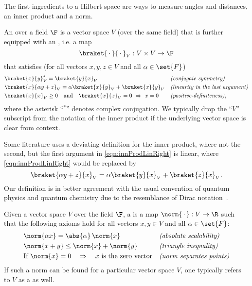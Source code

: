 The first ingredients to a Hilbert space are ways to measure
angles and distances, \ie an inner product and a norm.
\begin{defn}
	\label{def:InnerProduct}
	An  over a field $\F$
	is a vector space $V$ (over the same field)
	that is further equipped with an , i.e. a map
	\[ \braket{\slot}{\slot}_V : V \times V \to \F \]
	that satisfies%
	(for all vectors $x,y,z \in V$ and all $\alpha \in \set{F}$)
	\begin{align}
		\label{eqn:innProdConjSym}
			&\braket{x}{y}_V^\ast = \braket{y}{x}_V &&
			\text{\textit{(conjugate symmetry)}} \\
		\label{eqn:innProdLinRight}
			&\braket{x}{\alpha y + z}_V = \alpha \braket{x}{y}_V + \braket{x}{y}_V &&
			\text{\textit{(linearity in the last argument)}} \\
		\label{eqn:innProdPosDef}
			&\braket{x}{x}_V \ge 0 \quad \text{and}
			\quad \braket{x}{x}_V = 0 ~\Rightarrow~ x = 0  &&
			\text{\textit{(positive-definiteness)}},
	\end{align}
	where the asterisk ``$^\ast$'' denotes complex conjugation.
	We typically drop the ``$V$'' subscript from the notation of the inner
	product if the underlying vector space is clear from context.
\end{defn}

\begin{rem}
	Some literature uses a deviating definition for the inner product,
	where not the second,
	but the first argument in \eqref{eqn:innProdLinRight} is linear,
	\ie where \eqref{eqn:innProdLinRight} would be replaced by
	\[ \braket{\alpha y + z}{x}_V = \alpha \braket{y}{x}_V + \braket{z}{x}_V. \]
	Our definition is in better agreement with the usual convention
	of quantum physics and quantum chemistry
	due to the resemblance of Dirac notation~\cite{DiracNotation}.
\end{rem}

\begin{defn}
	Given a vector space $V$ over the field $\F$, a  is a map
	$\norm{\slot} : V \to \R$
	such that the following axioms hold for all vectors $x,y \in V$ and all $\alpha \in \set{F}$:
	\begin{align}
		\label{eqn:normScalability}
			&\norm{\alpha x} = \abs{\alpha} \, \norm{x} &&
			\text{\textit{(absolute scalability)}} \\
		\label{eqn:normTriaIneq}
			&\norm{x + y} \le \norm{x} + \norm{y} &&
			\text{\textit{(triangle inequality)}} \\
		\label{eqn:normPointSep}
			&\text{If}~\norm{x} = 0 \quad \Rightarrow
			\quad \text{$x$ is the zero vector} &&
			\text{\textit{(norm separates points)}}
	\end{align}
	If such a norm can be found for a particular vector space $V$,
	one typically refers to $V$ as a  as well.
\end{defn}

